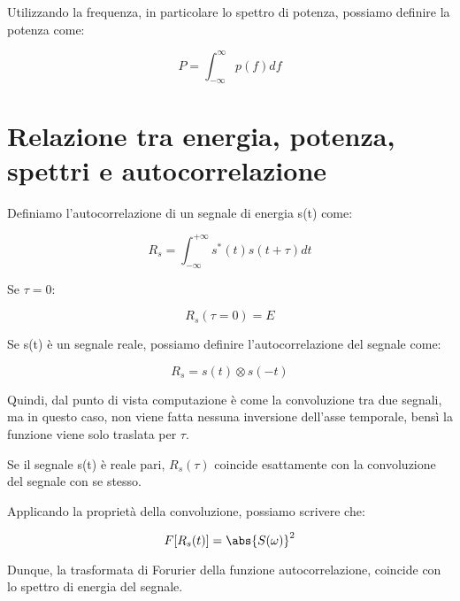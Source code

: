 Utilizzando la frequenza, in particolare lo spettro di potenza, possiamo definire la potenza come: 

{
    \Large 
    \begin{equation}
        P = \int_{- \infty}^{\infty}
        p(f) df 
    \end{equation}
}

\newpage

\section{Relazione tra energia, potenza, spettri e autocorrelazione} 

Definiamo l'autocorrelazione di un segnale di energia s(t) come: 

{
    \Large
    \begin{equation}
        R_s = \int_{- \infty}^{+ \infty}
        s^{*} (t) s(t + \tau) dt 
    \end{equation}
} 

Se $\tau = 0$: 

{
    \Large 
    \begin{equation}
        R_s (\tau = 0) = E
    \end{equation}
}

Se s(t) è un segnale reale, possiamo definire l'autocorrelazione del segnale come: 

{
    \Large 
    \begin{equation}
        R_s = s(t) \otimes s(-t)
    \end{equation}
}

Quindi, dal punto di vista computazione è come la convoluzione tra due segnali, 
ma in questo caso, non viene fatta nessuna inversione dell'asse temporale, bensì la funzione 
viene solo traslata per $\tau$. \newline 

Se il segnale s(t) è reale pari, $R_s (\tau)$ coincide esattamente con la convoluzione del segnale con se stesso. \newline 

Applicando la proprietà della convoluzione, possiamo scrivere che: 

{
    \Large 
    \begin{equation}
        F[R_s (t)] = \abs{S(\omega)} ^{2}
    \end{equation}
}

Dunque, la trasformata di Forurier della funzione autocorrelazione, coincide con lo spettro di energia del segnale. \newline 

